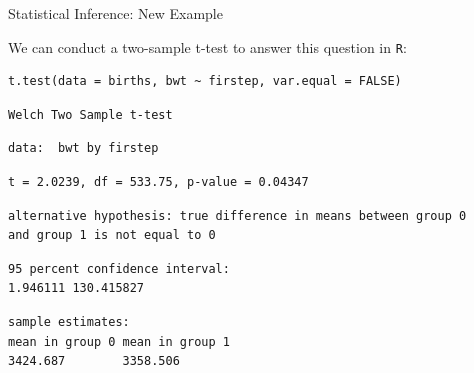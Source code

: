 \documentclass[10pt,t]{beamer}
\begin{document}
\begin{frame}[fragile=singleslide]{Statistical Inference: New Example}

\vspace{-5 mm}

We can conduct a two-sample t-test to answer this question in \texttt{R}:



\small
\begin{verbatim}t.test(data = births, bwt ~ firstep, var.equal = FALSE)\end{verbatim}
\smallskip

\begin{verbatim}
Welch Two Sample t-test
\end{verbatim}
\begin{verbatim}
data:  bwt by firstep
\end{verbatim}
\begin{verbatim}
t = 2.0239, df = 533.75, p-value = 0.04347
\end{verbatim}
\begin{verbatim}
alternative hypothesis: true difference in means between group 0 
and group 1 is not equal to 0
\end{verbatim}
\begin{verbatim}
95 percent confidence interval:
1.946111 130.415827
\end{verbatim}
\begin{verbatim}
sample estimates:
mean in group 0 mean in group 1 
3424.687        3358.506
\end{verbatim}

\end{frame}
\end{document}
